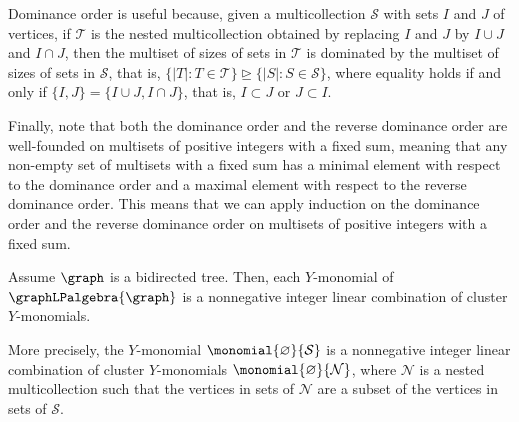 Dominance order is useful because,
given a multicollection \(\mathcal{S}\)
with sets \(I\) and \(J\) of vertices,
if \(\mathcal{T}\) is the nested multicollection obtained by replacing \(I\) and \(J\) by \(I \cup J\) and \(I \cap J\),
then the multiset of sizes of sets in \(\mathcal{T}\) is dominated by the multiset of sizes of sets in \(\mathcal{S}\), that is,
\( \{|T| : T \in \mathcal{T}\} \trianglerighteq \{|S| : S \in \mathcal{S}\} \),
where equality holds if and only if \(\{I, J\} = \{I \cup J, I \cap J\}\),
that is, \(I \subset J\) or \(J \subset I\).

Finally, note that both the dominance order and the reverse dominance order are well-founded on multisets of positive integers with a fixed sum, meaning that any non-empty set of multisets with a fixed sum has a minimal element with respect to the dominance order and a maximal element with respect to the reverse dominance order.
This means that we can apply induction on the dominance order and the reverse dominance order on multisets of positive integers with a fixed sum.

\begin{prop} \label{proposition:tree}
    Assume \(\graph\) is a bidirected tree.
    Then, each \(Y\)-monomial of \(\graphLPalgebra{\graph}\) is a nonnegative integer linear combination of cluster \(Y\)-monomials.

    More precisely, the \(Y\)-monomial \(\monomial{\varnothing}{\mathcal{S}}\) is a nonnegative integer linear combination of cluster \(Y\)-monomials \(\monomial{\varnothing}{\mathcal{N}}\), where \(\mathcal{N}\) is a nested multicollection such that the vertices in sets of \(\mathcal{N}\) are a subset of the vertices in sets of \(\mathcal{S}\).
\end{prop}

